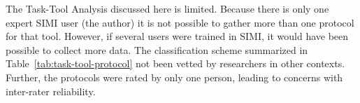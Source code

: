 The Task-Tool Analysis discussed here is limited. Because there is
only one expert SIMI user (the author) it is not possible to gather
more than one protocol for that tool. However, if several users were
trained in SIMI, it would have been possible to collect more data.
The classification scheme summarized in
Table~\ref{tab:task-tool-protocol} not been vetted by researchers in
other contexts. Further, the protocols were rated by only one person,
leading to concerns with inter-rater reliability.

